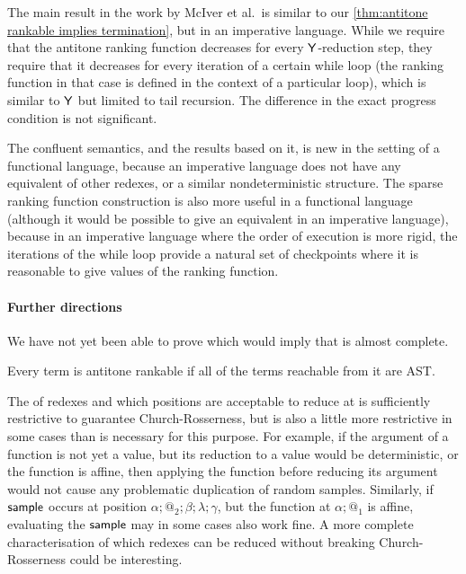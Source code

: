The main result in the work \cite{DBLP:journals/pacmpl/McIverMKK18} by McIver et al.~is similar to our \cref{thm:antitone rankable implies termination}, but in an imperative language. While we require that the antitone ranking function decreases for every $\mathsf{Y}$-reduction step, they require that it decreases for every iteration of a certain while loop (the ranking function in that case is defined in the context of a particular loop), which is similar to $\mathsf{Y}$ but limited to tail recursion. 
The difference in the exact progress condition is not significant. 

The confluent semantics, and the results based on it, is new in the setting of a functional language, because an imperative language does not have any equivalent of other redexes, or a similar nondeterministic structure. The sparse ranking function construction is also more useful in a functional language (although it would be possible to give an equivalent in an imperative language), because in an imperative language where the order of execution is more rigid, the iterations of the while loop provide a natural set of checkpoints where it is reasonable to give values of the ranking function.

\paragraph*{Further directions} We have not yet been able to prove  which would imply that  is almost complete.
\begin{conjecture}
\label{conj:antitone}
Every term is antitone rankable if all of the terms reachable from it are AST.
\end{conjecture}

The  of redexes and which positions are acceptable to reduce at is sufficiently restrictive to guarantee Church-Rosserness, but is also a little more restrictive in some cases than is necessary for this purpose. For example, if the argument of a function is not yet a value, but its reduction to a value would be deterministic, or the function is affine, then applying the function before reducing its argument would not cause any problematic duplication of random samples. Similarly, if $\mathsf{sample}$ occurs at position $\alpha;@_2;\beta;\lambda;\gamma$, but the function at $\alpha;@_1$ is affine, evaluating the $\mathsf{sample}$ may in some cases also work fine. A more complete characterisation of which redexes can be reduced without breaking Church-Rosserness could be interesting.

